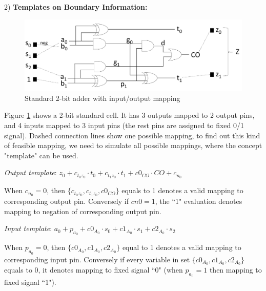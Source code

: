 2) {\bf Templates on Boundary Information:}
\begin{figure}[h]
	\begin{center}
	\includegraphics[width=\textwidth]{newfig/template.pdf}
	\end{center}
	\caption{Standard 2-bit adder with input/output mapping}
	\label{fig:template}
\end{figure}

Figure \ref{fig:template} shows a 2-bit standard cell. It has 3 outputs mapped to 2 output pins,
and 4 inputs mapped to 3 input pins (the rest pins are assigned to fixed 0/1 signal). Dashed connection
lines show one possible mapping, to find out this kind of feasible mapping, we need to simulate
all possible mappings, where the concept "template" can be used.

{\it Output template}: $z_0+c_{{t_0}{z_0}}\cdot t_0+c_{t_1z_0}\cdot t_1+c0_{CO}\cdot CO+c_{n_0}$

When $c_{n_0} = 0$, then $\{c_{t_0z_0},c_{t_1z_0},c0_{CO}\}$ equals to 1 denotes a valid mapping to corresponding output pin. 
Conversely if $cn0 = 1$, the ``1" evaluation denotes mapping to negation of corresponding output pin.

{\it Input template}: $a_0+p_{a_0}+c0_{A_0}\cdot s_0+c1_{A_0}\cdot s_1+c2_{A_0}\cdot s_2$

When $p_{a_0} = 0$, then $\{c0_{A_0},c1_{A_0},c2_{A_0}\}$ equal to 1 denotes a valid mapping to corresponding input
pin. Conversely if every variable in set $\{c0_{A_0},c1_{A_0},c2_{A_0}\}$ equals to 0, it denotes mapping to fixed signal ``0" (when $p_{a_0} = 1$ then
mapping to fixed signal ``1").

